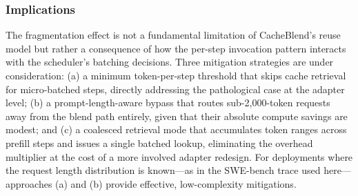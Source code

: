
\subsubsection{Implications}

The fragmentation effect is not a fundamental limitation of CacheBlend's reuse model but rather a consequence of how the per-step invocation pattern interacts with the scheduler's batching decisions. Three mitigation strategies are under consideration: (a) a minimum token-per-step threshold that skips cache retrieval for micro-batched steps, directly addressing the pathological case at the adapter level; (b) a prompt-length-aware bypass that routes sub-2{,}000-token requests away from the blend path entirely, given that their absolute compute savings are modest; and (c) a coalesced retrieval mode that accumulates token ranges across prefill steps and issues a single batched lookup, eliminating the overhead multiplier at the cost of a more involved adapter redesign. For deployments where the request length distribution is known---as in the SWE-bench trace used here---approaches (a) and (b) provide effective, low-complexity mitigations.
